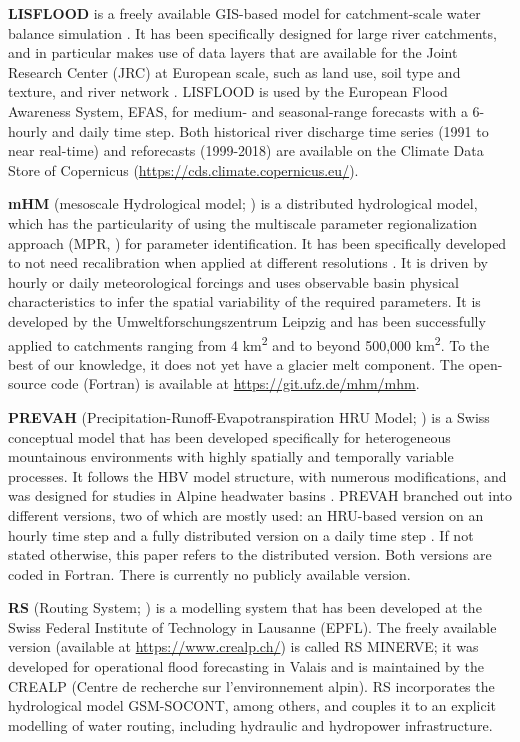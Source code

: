 \documentclass[10pt,a4paper]{article}
\begin{document}
\textbf{LISFLOOD} is a freely available GIS-based model for catchment-scale water balance simulation \citep[][\url{https://ec-jrc.github.io/lisflood-model/}]{vanDerKniff2010}. It has been specifically designed for large river catchments, and in particular makes use of data layers that are available for the Joint Research Center (JRC) at European scale, such as land use, soil type and texture, and river network \citep{Thielen2009}. LISFLOOD is used by the European Flood Awareness System, EFAS, for medium- and seasonal-range forecasts with a 6-hourly and daily time step. Both historical river discharge time series (1991 to near real-time) and reforecasts (1999-2018) are available on the Climate Data Store of Copernicus (\url{https://cds.climate.copernicus.eu/}). 

\textbf{mHM} (mesoscale Hydrological model; \citealt{Samaniego2010a, Kumar2013, Thober2019}) is a distributed hydrological model, which has the particularity of using the multiscale parameter regionalization approach (MPR, \citealp{Samaniego2010a}) for parameter identification. It has been specifically developed to not need recalibration when applied at different resolutions \citep{Kauffeldt2016}. It is driven by hourly or daily meteorological forcings and uses observable basin physical characteristics to infer the spatial variability of the required parameters. It is developed by the Umweltforschungszentrum Leipzig and has been successfully applied to catchments ranging from 4 km\textsuperscript{2} and to beyond 500,000 km\textsuperscript{2}. To the best of our knowledge, it does not yet have a glacier melt component. The open-source code (Fortran) is available at \url{https://git.ufz.de/mhm/mhm}.

\textbf{PREVAH} (Precipitation-Runoff-Evapotranspiration HRU Model; \citealt{Gurtz1999, Viviroli2009a}) is a Swiss conceptual model that has been developed specifically for heterogeneous mountainous environments with highly spatially and temporally variable processes. It follows the HBV model structure, with numerous modifications, and was designed for studies in Alpine headwater basins \citep{Orth2015}. PREVAH branched out into different versions, two of which are mostly used: an HRU-based version on an hourly time step \citep{Viviroli2009a} and a fully distributed version on a daily time step \citep{Zappa2012, Speich2015}. If not stated otherwise, this paper refers to the distributed version. Both versions are coded in Fortran. There is currently no publicly available version.

\textbf{RS} (Routing System; \citealp{Dubois2000, GarciaHernandez2020, Foehn2020}) is a modelling system that has been developed at the Swiss Federal Institute of Technology in Lausanne (EPFL). The freely available version (available at \url{https://www.crealp.ch/}) is called RS MINERVE; it was developed for operational flood forecasting in Valais \citep{GarciaHernandez2009b, Hamdi2005} and is maintained by the CREALP (Centre de recherche sur l'environnement alpin). RS incorporates the hydrological model GSM-SOCONT, among others, and couples it to an explicit modelling of water routing, including hydraulic and hydropower infrastructure.
\end{document}
